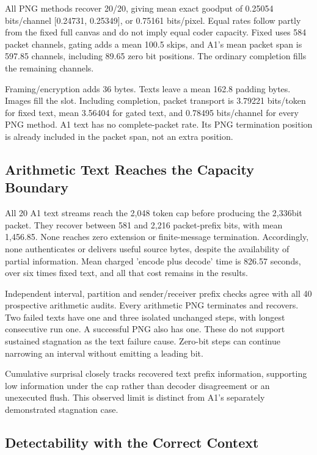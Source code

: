 \documentclass[a4paper,twoside]{article}
\begin{document}
All PNG methods recover 20/20, giving mean exact goodput of 0.25054 bits/channel [0.24731, 0.25349], or 0.75161 bits/pixel. Equal rates follow partly from the fixed full canvas and do not imply equal coder capacity. Fixed uses 584 packet channels, gating adds a mean 100.5 skips, and A1's mean packet span is 597.85 channels, including 89.65 zero bit positions. The ordinary completion fills the remaining channels.

Framing/encryption adds 36 bytes. Texts leave a mean 162.8 padding bytes. Images fill the slot. Including completion, packet transport is 3.79221 bits/token for fixed text, mean 3.56404 for gated text, and 0.78495 bits/channel for every PNG method. A1 text has no complete-packet rate. Its PNG termination position is already included in the packet span, not an extra position.

\subsection{Arithmetic Text Reaches the Capacity Boundary}
All 20 A1 text streams reach the 2,048 token cap before producing the 2,336bit packet. They recover between 581 and 2,216 packet-prefix bits, with mean 1,456.85. None reaches zero extension or finite-message termination. Accordingly, none authenticates or delivers useful source bytes, despite the availability of partial information. Mean charged 'encode plus decode' time is 826.57 seconds, over six times fixed text, and all that cost remains in the results.

Independent interval, partition and sender/receiver prefix checks agree with all 40 prospective arithmetic audits. Every arithmetic PNG terminates and recovers. Two failed texts have one and three isolated unchanged steps, with longest consecutive run one. A successful PNG also has one. These do not support sustained stagnation as the text failure cause. Zero-bit steps can continue narrowing an interval without emitting a leading bit.

Cumulative surprisal closely tracks recovered text prefix information, supporting low information under the cap rather than decoder disagreement or an unexecuted flush. This observed limit is distinct from A1's separately demonstrated stagnation case.



\subsection{Detectability with the Correct Context}
\label{sec:detection-results}
\end{document}
